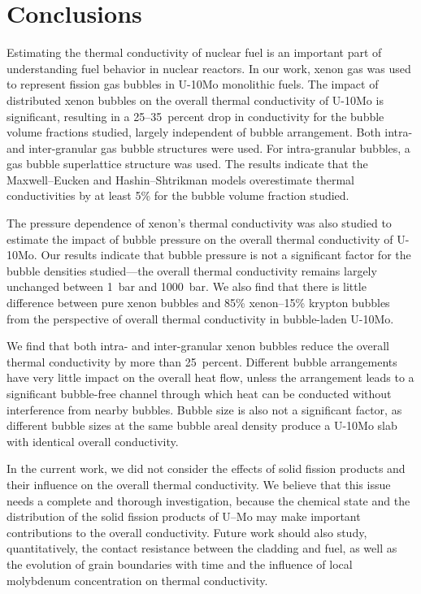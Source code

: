 \section{\label{sec:conclusion}Conclusions}

Estimating the thermal conductivity of nuclear fuel is an important part of understanding fuel behavior in nuclear reactors. In our work, xenon gas was used to represent fission gas bubbles in \mbox{U-10Mo} monolithic fuels. The impact of distributed xenon bubbles on the overall thermal conductivity of \mbox{U-10Mo} is significant, resulting in a 25--35~percent drop in conductivity for the bubble volume fractions studied, largely independent of bubble arrangement. Both intra- and inter-granular gas bubble structures were used. For intra-granular bubbles, a gas bubble superlattice structure was used. The results indicate that the Maxwell--Eucken and Hashin--Shtrikman models overestimate thermal conductivities by at least 5\% for the bubble volume fraction studied.

The pressure dependence of xenon's thermal conductivity was also studied to estimate the impact of bubble pressure on the overall thermal conductivity of \mbox{U-10Mo}. Our results indicate that bubble pressure is not a significant factor for the bubble densities studied---the overall thermal conductivity remains largely unchanged between 1~bar and 1000~bar.
We also find that there is little difference between pure xenon bubbles and
85\% xenon--15\% krypton bubbles from the perspective of overall thermal
conductivity in bubble-laden \mbox{U-10Mo}.

We find that both intra- and inter-granular xenon bubbles reduce the overall thermal conductivity by more than 25~percent. Different bubble arrangements have very little impact on the overall heat flow, unless the arrangement leads to a significant bubble-free channel through which heat can be conducted without interference from nearby bubbles. Bubble size is also not a significant factor, as different bubble sizes at the same bubble areal density produce a U-10Mo slab with identical overall conductivity.

{In the current work, we did not consider the effects of solid
fission products and their influence on the overall thermal conductivity. We
believe that this issue needs a complete and thorough investigation, because the
chemical state and the distribution of the solid fission products of U--Mo may
make important contributions to the overall conductivity.}
Future work should also study, quantitatively, the contact resistance between
the cladding and fuel, as well as the evolution of grain boundaries with time
and the influence of local molybdenum concentration on thermal conductivity.





%


%
